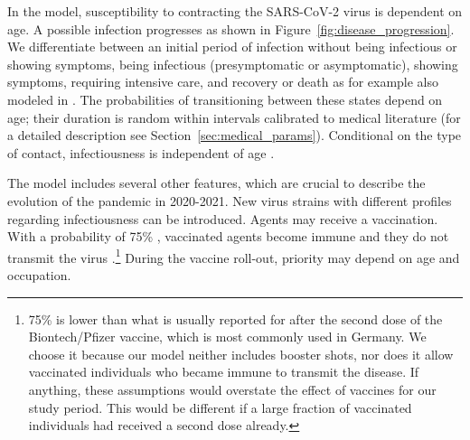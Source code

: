 \begin{figure}
\end{figure}

In the model, susceptibility to contracting the SARS-CoV-2 virus is dependent on age. A
possible infection progresses as shown in Figure~\ref{fig:disease_progression}. We
differentiate between an initial period of infection without being infectious or showing
symptoms, being infectious (presymptomatic or asymptomatic), showing symptoms, requiring
intensive care, and recovery or death as for example also modeled in \cite{Grimm2021}.
The probabilities of transitioning between these states depend on age; their duration is
random within intervals calibrated to medical literature (for a detailed description see
Section~\ref{sec:medical_params}). Conditional on the type of contact, infectiousness is
independent of age \citep{Jones2021}.

The model includes several other features, which are crucial to describe the evolution
of the pandemic in 2020-2021. New virus strains with different profiles regarding
infectiousness can be introduced. Agents may receive a vaccination. With a probability
of 75\% \citep{Hunter2021}, vaccinated agents become immune and they do not transmit the
virus \citep{Petter2021, LevineTiefenbrun2021, Pritchard2021}.\footnote{75\% is lower
    than what is usually reported for after the second dose of the Biontech/Pfizer vaccine,
    which is most commonly used in Germany. We choose it because our model neither includes
    booster shots, nor does it allow vaccinated individuals who became immune to transmit
    the disease\citep{Petter2021, LevineTiefenbrun2021, Pritchard2021}. If anything, these
    assumptions would overstate the effect of vaccines for our study period. This would be
    different if a large fraction of vaccinated individuals had received a second dose
    already.} During the vaccine roll-out, priority may depend on age and occupation.

